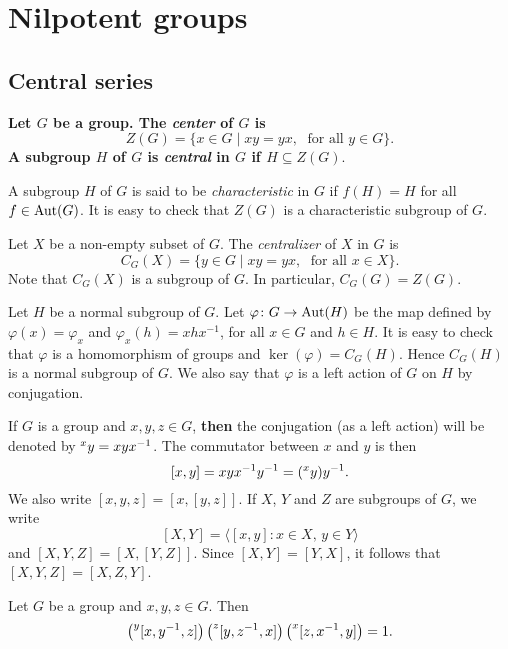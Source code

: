 \chapter{Nilpotent groups}
\label{nilpotent}

\section*{\bf Central series}

{\bf Let $G$ be a group. The {\em center} of $G$ is 
\[ Z(G)=\{ x\in G\mid xy=yx,\; \mbox{ for all } y\in G\}.\]
A subgroup $H$ of $G$ is {\em central} in $G$ if $H\subseteq Z(G).$

A subgroup $H$ of $G$ is said to be {\em characteristic} in $G$ if $f(H)=H$ for all $f\in\operatorname{Aut}(G)$. It is easy to check that $Z(G)$ is a characteristic subgroup of $G$. 

Let $X$ be a non-empty subset of $G$. The {\em centralizer} of $X$ in $G$ is
\[ C_G(X)=\{ y\in G\mid xy=yx,\;\mbox{ for all }x\in X\}.
\]
Note that $C_G(X)$ is a subgroup of $G$. In particular, $C_G(G)=Z(G)$.

Let $H$ be a normal subgroup of $G$. Let $\varphi\colon G\rightarrow \operatorname{Aut}(H)$ be the map defined by $\varphi(x)=\varphi_x$ and
$\varphi_x(h)=xhx^{-1}$, for all $x\in G$ and $h\in H$. It is easy to check that $\varphi$ is a homomorphism of groups and $\ker(\varphi)=C_G(H)$. Hence $C_G(H)$ is a normal subgroup of $G$. We also say that $\varphi$ is a left action of $G$ on $H$ by conjugation.
}

If $G$ is a group and $x,y,z\in G$, {\bf then} the conjugation (as a left action) will be denoted
by $\prescript{x}{}y=xyx^{-1}$. The commutator between $x$ and $y$ is then 
\[
[x,y]=xyx^{-1}y^{-1}=(\prescript{x}{}y)y^{-1}.
\]
We also write 
$[x,y,z]=[x,[y,z]]$. 
If $X$, $Y$ and $Z$ are subgroups of $G$, we write 
\[
[X,Y]=\langle [x,y]:x\in X,\,y\in Y\rangle
\]
and $[X,Y,Z]=\left[ X,[Y,Z] \right]$. Since $[X,Y]=[Y,X]$, it follows that  
$[X,Y,Z]=[X,Z,Y]$. 

\begin{exercise}
	\label{xca:HallWitt}
	Let $G$ be a group and $x,y,z\in G$. Then 
	\begin{equation}
		\label{eq:HallWitt}
	\left(\prescript{y}{}[x,y^{-1},z]\right)\left(\prescript{z}{}[y,z^{-1},x]\right)\left(\prescript{x}{}[z,x^{-1},y]\right)=1.
	\end{equation}
\end{exercise}

